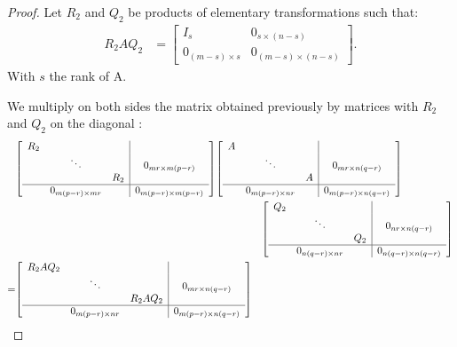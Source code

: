 \documentclass[11pt]{article}
\begin{document}
\begin{proof}
Let $R_2$ and $Q_2$ be products of elementary transformations such that:
\begin{align*}
    R_2AQ_2 &=\begin{bmatrix}
    I_s & 0_{s\times(n-s)}\\
    0_{(m-s)\times s} & 0_{(m-s)\times (n-s)}
    \end{bmatrix}.
\end{align*}
With $s$ the rank of A.

We multiply on both sides the matrix obtained previously by matrices with $R_2$ and $Q_2$ on the diagonal :
\begin{align*}
    &\mleft[\begin{array}{c c c|c}
    R_2 & & & \\
    & \ddots &  &0_{mr \times m(p-r)} \\
    & & R_2 & \\\hline
    & 0_{m(p-r) \times mr} & & 0_{m(p-r) \times m(p-r)} \\
    \end{array} \mright]
    \mleft[\begin{array}{c c c|c}
    A & & & \\
    & \ddots &  &0_{mr \times n(q-r)} \\
    & & A & \\\hline
    & 0_{m(p-r) \times nr} & & 0_{m(p-r) \times n(q-r)} \\
    \end{array} \mright]\\
    &\qquad\qquad\qquad\qquad\qquad\qquad\qquad\qquad\qquad\qquad\qquad\qquad
\mleft[\begin{array}{c c c|c}
    Q_2 & & & \\
    & \ddots &  &0_{nr \times n(q-r)} \\
    & & Q_2 & \\\hline
    & 0_{n(q-r) \times nr} & & 0_{n(q-r) \times n(q-r)} \\
    \end{array} \mright]\\
    =& \mleft[\begin{array}{c c c|c}
    R_2AQ_2 & & & \\
    & \ddots &  &0_{mr \times n(q-r)} \\
    & & R_2AQ_2 & \\\hline
    & 0_{m(p-r) \times nr} & & 0_{m(p-r) \times n(q-r)} \\
    \end{array} \mright]\\

\end{align*}
\end{proof}
\end{document}
